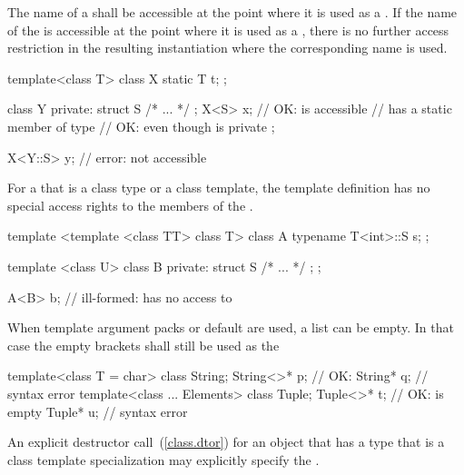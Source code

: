 \pnum
The name of a
shall be accessible at the point where it is used as a
.
\enternote
If the name of the
is accessible at the point where it is used as a
,
there is no further access restriction in the resulting instantiation where the
corresponding
name is used.
\exitnote
\enterexample

\begin{codeblock}
template<class T> class X {
  static T t;
};

class Y {
private:
  struct S { /* ... */ };
  X<S> x;           // OK:  is accessible
                    //  has a static member of type 
                    // OK: even though  is private
};

X<Y::S> y;          // error:  not accessible
\end{codeblock}
\exitexample
For a
that is a class type or a class template, the template
definition has no special access rights to the
members of the . \enterexample

\begin{codeblock}
template <template <class TT> class T> class A {
  typename T<int>::S s;
};

template <class U> class B {
private:
  struct S { /* ... */ };
};

A<B> b;             // ill-formed:  has no access to 
\end{codeblock}
\exitexample

\pnum
When template argument packs or default
are used, a
list can be empty.
In that case the empty
\tcode{<>}
brackets shall still be used as the
\enterexample

\begin{codeblock}
template<class T = char> class String;
String<>* p;                    // OK: 
String* q;                      // syntax error
template<class ... Elements> class Tuple;
Tuple<>* t;                     // OK:  is empty
Tuple* u;                       // syntax error
\end{codeblock}
\exitexample

\pnum
An explicit destructor call~(\ref{class.dtor}) for an object that has a type
that is a class template specialization may explicitly specify the
.
\enterexample

